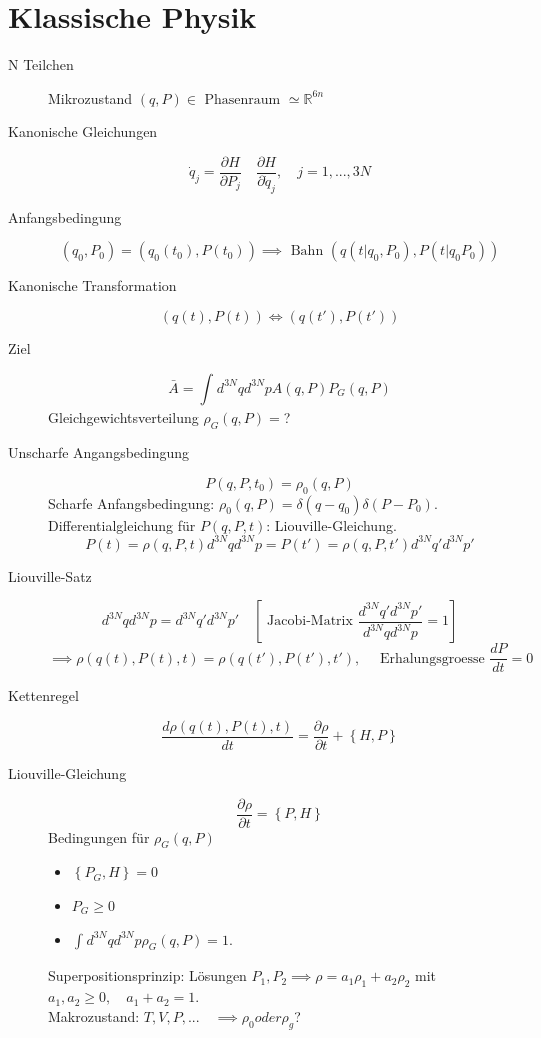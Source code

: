 \documentclass[11pt]{article}
\theoremstyle{plain}
\newcommand{\R}{\mathbb{R}}
\newcommand{\pd}[2]{\frac{\partial #1 }{\partial #2}}
\begin{document}
\section{Klassische Physik}
\begin{description}
  \item[N Teilchen ] Mikrozustand $(q,P) \in  \text{ Phasenraum } \simeq \R^{6n}$
  \item[Kanonische Gleichungen] \[ \dot{q}_j = \pd{H}{P_j} \quad \pd{H}{\dot{q}_j}, \quad j=1,...,3N \] 
  \item[Anfangsbedingung] \[ (q_0, P_0)= (q_0(t_0), P(t_0)) \implies \text{ Bahn } (q(t | q_0, P_0), P(t| q_0 P_0)) \] 
  \item[Kanonische Transformation ] \[ (q(t), P(t)) \iff (q(t'), P(t')) \] 
  \item[Ziel] \[ \bar{A}= \int_{}^{} d^{3N}q d^{3N}p A(q,P) P_G(q,P) \] 
    Gleichgewichtsverteilung $\rho_G(q,P)= $?
  \item[Unscharfe Angangsbedingung] \[ P(q,P,t_0)= \rho_0 (q,P) \] 
    Scharfe Anfangsbedingung: $\rho_0(q,P) = \delta(q-q_0) \delta (P-P_0)$.
    Differentialgleichung f\"ur $P(q,P,t)$: Liouville-Gleichung.
    \[ P(t)= \rho(q,P,t)d^{3N}q d^{3N}p=P(t') = \rho(q,P,t')d^{3N}q' d^{3N}p' \] 
  \item[Liouville-Satz] \[ d^{3N}q d^{3N}p = d^{3N}q' d^{3N}p' \quad \left[ \text{ Jacobi-Matrix } \frac{d^{3N}q' d^{3N}p'}{d^{3N}q d^{3N}p}= 1 \right] \] 
    \[ \implies \rho(q(t), P(t), t)= \rho (q(t'), P(t'), t'), \quad \text{ Erhalungsgroesse } \frac{dP}{dt}=0 \] 
  \item[Kettenregel] \[ \frac{d \rho(q(t), P(t),t)}{dt}= \pd{\rho}{t} + \left\{ H,P \right\} \] 
  \item[Liouville-Gleichung] \[ \pd{\rho}{t}= \left\{ P,H \right\} \] 
    Bedingungen f\"ur $\rho_G(q,P)$
    \begin{itemize}
      \item $\left\{ P_G, H \right\}=0$
      \item $P_G \ge 0$
      \item $\int_{}^{}d^{3N}q d^{3N}p \rho_G (q,P)=1$.
    \end{itemize}
    Superpositionsprinzip: L\"osungen $P_1,P_2 \implies \rho=a_1 \rho_1+ a_2 \rho_2 $
    mit $a_1,a_2 \ge 0, \quad a_1+a_2 =1$. \\
    Makrozustand: $T,V,P,... \quad  \implies \rho_0 oder \rho_g$?\\
\end{description}
\end{document}
